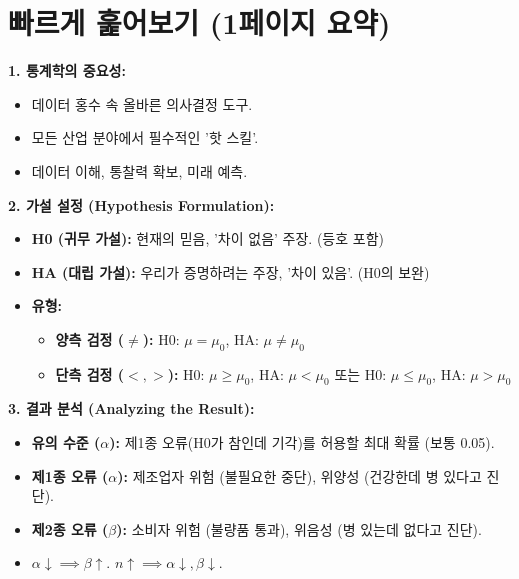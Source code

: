 \documentclass[11pt,a4paper]{article}
\theoremstyle{definition}
\begin{document}
\tableofcontents

\newpage

\section*{빠르게 훑어보기 (1페이지 요약)}

\begin{tcolorbox}[colback=lightblue, colframe=darkblue, title=\textbf{모듈 1 핵심 요약: 가설 검정의 기초}]

\textbf{1. 통계학의 중요성:}
\begin{itemize}
    \item 데이터 홍수 속 올바른 의사결정 도구.
    \item 모든 산업 분야에서 필수적인 '핫 스킬'.
    \item 데이터 이해, 통찰력 확보, 미래 예측.
\end{itemize}

\textbf{2. 가설 설정 (Hypothesis Formulation):}
\begin{itemize}
    \item \textbf{H0 (귀무 가설):} 현재의 믿음, '차이 없음' 주장. (등호 포함)
    \item \textbf{HA (대립 가설):} 우리가 증명하려는 주장, '차이 있음'. (H0의 보완)
    \item \textbf{유형:}
        \begin{itemize}
            \item \textbf{양측 검정 ($\ne$):} H0: $\mu = \mu_0$, HA: $\mu \ne \mu_0$
            \item \textbf{단측 검정 ($<, >$):} H0: $\mu \ge \mu_0$, HA: $\mu < \mu_0$ 또는 H0: $\mu \le \mu_0$, HA: $\mu > \mu_0$
        \end{itemize}
\end{itemize}

\textbf{3. 결과 분석 (Analyzing the Result):}
\begin{itemize}
    \item \textbf{유의 수준 ($\alpha$):} 제1종 오류(H0가 참인데 기각)를 허용할 최대 확률 (보통 0.05).
    \item \textbf{제1종 오류 ($\alpha$):} 제조업자 위험 (불필요한 중단), 위양성 (건강한데 병 있다고 진단).
    \item \textbf{제2종 오류 ($\beta$):} 소비자 위험 (불량품 통과), 위음성 (병 있는데 없다고 진단).
    \item $\alpha \downarrow \implies \beta \uparrow$. $n \uparrow \implies \alpha \downarrow, \beta \downarrow$.
\end{itemize}


\end{tcolorbox}
\end{document}
